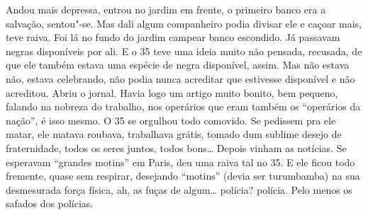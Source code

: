 \begin{linenumbers}
Andou mais depressa, entrou no jardim em frente, o primeiro banco era a
salvação, sentou"-se. Mas dali algum companheiro podia divisar ele e
caçoar mais, teve raiva. Foi lá no fundo do jardim campear banco
escondido. Já passavam negras disponíveis por ali. E o 35 teve uma ideia
muito não pensada, recusada, de que ele também estava uma espécie de
negra disponível, assim. Mas não estava não, estava celebrando, não
podia nunca acreditar que estivesse disponível e não acreditou. Abriu o
jornal. Havia logo um artigo muito bonito, bem pequeno, falando na
nobreza do trabalho, nos operários que eram também os ``operários da
nação'', é isso mesmo. O 35 se orgulhou todo comovido. Se pedissem pra
ele matar, ele matava roubava, trabalhava grátis, tomado dum sublime
desejo de fraternidade, todos os seres juntos, todos bons\ldots{} Depois
vinham as notícias. Se esperavam ``grandes motins'' em Paris, deu uma
raiva tal no 35. E ele ficou todo fremente, quase sem respirar,
desejando ``motins'' (devia ser turumbamba) na sua desmesurada força
física, ah, as fuças de algum\ldots{} polícia? polícia. Pelo menos os safados
dos polícias.


\end{linenumbers}
